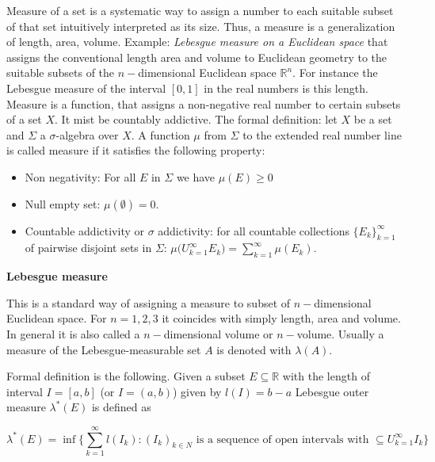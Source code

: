 Measure of a set is a systematic way to assign a number to each suitable subset of that set intuitively interpreted as its size. Thus, a measure is a generalization of length, area, volume. Example: \textit{Lebesgue measure on a Euclidean space} that assigns the conventional length area and volume to Euclidean geometry to the suitable subsets of the $n-$dimensional Euclidean space $\mathbb{R}^n$. For instance the Lebesgue measure of the interval $[0,1]$ in the real numbers is this length. 
%
Measure is a function, that assigns a non-negative real number to certain subsets of a set $X$. It mist be countably addictive. 
%
The formal definition: let $X$ be a set and $\Sigma$ a $\sigma$-algebra over $X$. A function $\mu$ from $\Sigma$ to the extended real number line is called measure if it satisfies the following property:
%
\begin{itemize}
    \item Non negativity: For all $E$ in $\Sigma$ we have $\mu(E)\geq 0$
    \item Null empty set: $\mu(\emptyset) = 0$.
    \item Countable addictivity or $\sigma$ addictivity: for all countable collections $\{E_k\}_{k=1}^{\infty}$ of pairwise disjoint sets in $\Sigma$: $\mu\Big(U_{k=1}^{\infty}E_k\Big) = \sum_{k=1}^{\infty}\mu(E_k)$.
\end{itemize}

\textbf{Lebesgue measure} 

This is a standard way of assigning a measure to subset of $n-$dimensional Euclidean space. For $n=1,2,3$ it coincides with simply length, area and volume. In general it is also called a $n-$dimensional volume or $n-$volume. 
Usually a measure of the Lebesgue-measurable set $A$ is denoted with $\lambda(A)$. 

Formal definition is the following.
Given a subset $E\subseteq\mathbb{R}$ with the length of interval $I=[a,b]$ (or $I=(a,b)$) given by $l(I) = b-a$ Lebesgue outer measure $\lambda^*(E)$ is defined as 

\begin{equation}
\lambda^*(E) = \inf\Bigg\{\sum_{k=1}^{\infty}l(I_k):(I_k)_{k\in N} \text{ is a sequence of open intervals with } \subseteq U_{k=1}^{\infty}I_k\Bigg\}
\end{equation}

